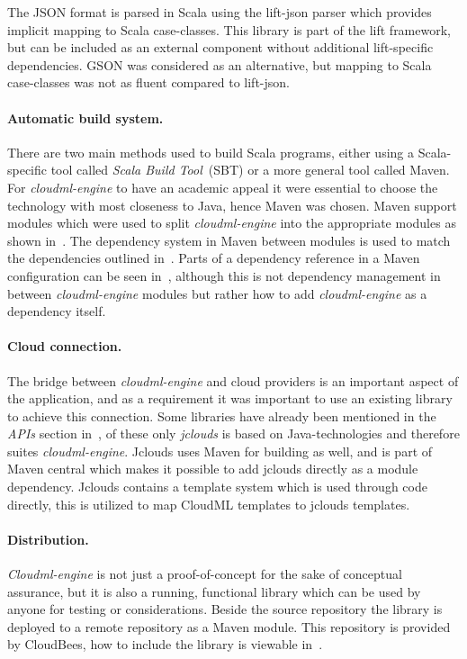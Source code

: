 The JSON format is parsed in Scala using the lift-json parser which provides implicit
mapping to Scala case-classes. This library is part of the lift framework,
but can be included as an external component without additional lift-specific dependencies.
GSON was considered as an alternative, but mapping to Scala case-classes was not as 
fluent compared to lift-json.

\paragraph{Automatic build system.}
There are two main methods used to build Scala programs, either using a Scala-specific tool called 
\emph{Scala Build Tool}~(SBT) or a more general tool called Maven. 
For \emph{cloudml-engine} to have an academic appeal it were essential to choose the technology
with most closeness to Java, hence Maven was chosen.
Maven support modules which were used to split \emph{cloudml-engine} into the appropriate 
modules as shown in~. 
The dependency system in Maven between modules is used to match the dependencies outlined in~.
Parts of a dependency reference in a Maven configuration can be seen in~,
although this is not dependency management in between \emph{cloudml-engine} modules but rather
how to add \emph{cloudml-engine} as a dependency itself.

\paragraph{Cloud connection.}
The bridge between \emph{cloudml-engine} and cloud providers is an important aspect of the application, and as a requirement
it was important to use an existing library to achieve this connection.
Some libraries have already been mentioned in the \emph{APIs} section in~,
of these only \emph{jclouds} is based on Java-technologies and therefore suites \emph{cloudml-engine}.
Jclouds uses Maven for building as well, and is part of Maven central which makes 
it possible to add jclouds directly as a module dependency.
Jclouds contains a template system which is used through code directly, this is utilized 
to map CloudML templates to jclouds templates.

\paragraph{Distribution.}
\emph{Cloudml-engine} is not just a proof-of-concept for the sake of conceptual assurance, but it is 
also a running, functional library which can be used by anyone for testing or considerations.
Beside the source repository\cite{cloudml-engine} the library is deployed to a remote repository
\cite{cloudbees-cloudml-engine} as a Maven module.
This repository is provided by CloudBees, 
how to include the library is viewable in~.

